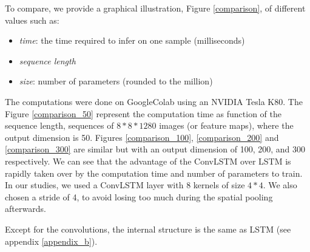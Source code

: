 \documentclass[12pt, a4paper]{report}
\begin{document}
					\par
					To compare, we provide a graphical illustration, Figure \ref{comparison}, of different values such as:
					\begin{itemize}
						\item {\itshape time}: the time required to infer on one sample (milliseconds)
						\item {\itshape sequence length}
						\item {\itshape size}: number of parameters (rounded to the million)
					\end{itemize}
					The computations were done on GoogleColab using an NVIDIA Tesla K80.
					The Figure \ref{comparison_50} represent the computation time as function of the sequence length, sequences of $8*8*1280$ images (or feature maps), where the output dimension is 50.
					Figures \ref{comparison_100}, \ref{comparison_200} and \ref{comparison_300} are similar but with an output dimension of 100, 200, and 300 respectively.
					We can see that the advantage of the ConvLSTM over LSTM is rapidly taken over by the computation time and number of parameters to train.
					In our studies, we used a ConvLSTM layer with 8 kernels of size $4*4$.
					We also chosen a stride of 4, to avoid losing too much during the spatial pooling afterwards.
					\par
					Except for the convolutions, the internal structure is the same as LSTM (see appendix \ref{appendix_b}).
\end{document}
